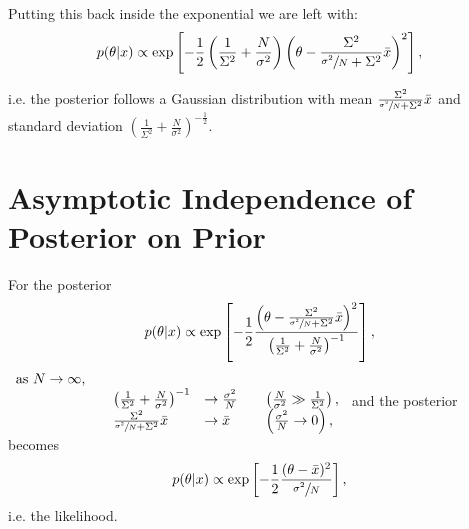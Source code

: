 \documentclass[a4paper,11pt,twoside]{article}
\begin{document}
Putting this back inside the exponential we are left with:
\begin{equation*}
	p(\theta|x) \propto \exp \left[ -\frac{1}{2} \left( \frac{1}{\Sigma^2} + \frac{N}{\sigma^2} \right) \left( \theta - \frac{\Sigma^2}{\sfrac{\sigma^2}{N} + \Sigma^2} \bar{x} \right)^2 \right],
\end{equation*}

i.e. the posterior follows a Gaussian distribution with mean $\frac{\Sigma^2}{\sfrac{\sigma^2}{N} + \Sigma^2} \bar{x}$ and standard deviation $\left( \frac{1}{\Sigma^2} + \frac{N}{\sigma^2} \right)^{-\frac{1}{2}}$.

\section{Asymptotic Independence of Posterior on Prior}
For the posterior
\begin{equation*}
	p(\theta|x) \propto \exp \left[-\frac{1}{2} \frac{ \left( \theta - \frac{\Sigma^2}{\sfrac{\sigma^2}{N} + \Sigma^2} \bar{x} \right)^2}{ \left( \frac{1}{\Sigma^2} + \frac{N}{\sigma^2} \right)^{-1}} \right],
\end{equation*}
$
\begin{array}{l l l l}
	\text{as }N \rightarrow \infty, &\quad 
	\\ &\quad \left( \frac{1}{\Sigma^2} + \frac{N}{\sigma^2} \right)^{-1} &\rightarrow \frac{\sigma^2}{N} \quad &\left(\frac{N}{\sigma^2} \gg \frac{1}{\Sigma^2}\right), 
	\\ &\quad \frac{\Sigma^2}{\sfrac{\sigma^2}{N} + \Sigma^2} \bar{x} &\rightarrow \bar{x} \quad &\left(\frac{\sigma^2}{N} \rightarrow 0\right),
\end{array}
$
and the posterior becomes
\begin{equation*}
	p(\theta|x) \propto \exp \left[-\frac{1}{2} \frac{(\theta - \bar{x})^2}{\sfrac{\sigma^2}{N}} \right], 
\end{equation*}
i.e. the likelihood.
\end{document}
